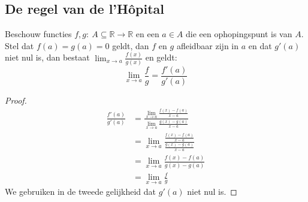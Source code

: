 \documentclass[main.tex]{subfiles}
\begin{document}
\subsection{De regel van de l'H\^opital}
\label{sec:de-regel-van}

\begin{bpr}
  Beschouw functies $f,g:\ A \subseteq \mathbb{R} \rightarrow \mathbb{R}$ en een $a\in A$ die een ophopingspunt is van $A$.
  Stel dat $f(a)=g(a)=0$ geldt, dan $f$ en $g$ afleidbaar zijn in $a$ en dat $g'(a)$ niet nul is, dan bestaat $\lim_{x \rightarrow a}\frac{f(x)}{g(x)}$ en geldt:
  \[ \lim_{x\rightarrow a}\frac{f}{g}= \frac{f'(a)}{g'(a)} \]

  \begin{proof}
    \[
    \begin{array}{rl}
      \frac{f'(a)}{g'(a)}
      &= \frac{\lim_{x\rightarrow a}\frac{f(x)-f(a)}{x-a}}{\lim_{x\rightarrow a}\frac{g(x)-g(a)}{x-a}}\\
      &= \lim_{x\rightarrow a}\frac{\frac{f(x)-f(a)}{x-a}}{\frac{g(x)-g(a)}{x-a}}\\
      &= \lim_{x\rightarrow a}\frac{f(x)-f(a)}{g(x)-g(a)}\\
      &= \lim_{x\rightarrow a}\frac{f}{g}
    \end{array}
    \]
    We gebruiken in de tweede gelijkheid dat $g'(a)$ niet nul is.
  \end{proof}
\end{bpr}
\end{document}
